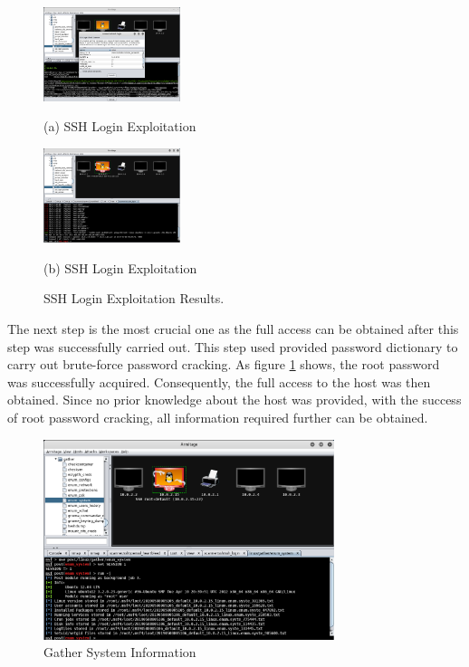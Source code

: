\documentclass{article}
\begin{document}
\begin{figure}[H]
  \begin{minipage}[b]{.48\linewidth}
    \centering
    \centerline{\includegraphics[width=4.0cm]{kali7}}
    \centerline{(a) SSH Login Exploitation}\medskip
  \end{minipage}
  \hfill
  \begin{minipage}[b]{0.48\linewidth}
    \centering
    \centerline{\includegraphics[width=4.0cm]{kali8}}
    \centerline{(b) SSH Login Exploitation}\medskip
  \end{minipage}
  \caption{SSH Login Exploitation Results.}
  \label{kali7-8}
  \end{figure}
The next step is the most crucial one as the full access can be obtained after this step was successfully 
carried out. This step used provided password dictionary to carry out brute-force password cracking.
As figure \ref{kali7-8} shows, the root password was successfully acquired. Consequently, the full access to 
the host was then obtained.
Since no prior knowledge about the host was provided, with the success of root password cracking, 
all information required further can be obtained.

\begin{figure}[H]
  \includegraphics[width=8.5cm]{kali9}
  \caption{Gather System Information}
  \label{kali9}
\end{figure}
\end{document}

